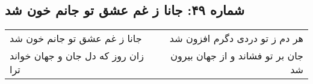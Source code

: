 \begin{center}
\section*{شماره ۴۹: جانا ز غم عشق تو جانم خون شد}
\label{sec:049}
\begin{longtable}{l p{0.5cm} r}
جانا ز غم عشق تو جانم خون شد
&&
هر دم ز تو دردی دگرم افزون شد
\\
زان روز که دل جان و جهان خواند ترا
&&
جان بر تو فشاند و از جهان بیرون شد
\\
\end{longtable}
\end{center}

